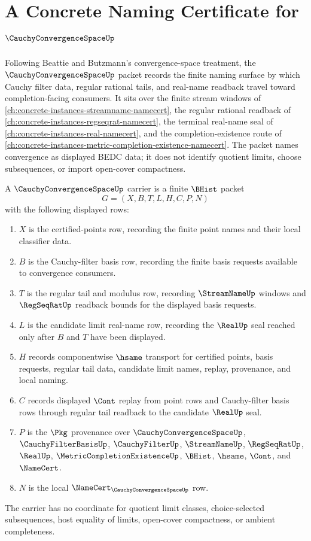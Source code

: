 \chapter{A Concrete Naming Certificate for $\CauchyConvergenceSpaceUp$}
\label{ch:concrete-instances-cauchy-convergence-space-namecert}

Following Beattie and Butzmann's convergence-space treatment, the $\CauchyConvergenceSpaceUp$ packet records the finite naming surface by which Cauchy filter data, regular rational tails, and real-name readback travel toward completion-facing consumers. It sits over the finite stream windows of \autoref{ch:concrete-instances-streamname-namecert}, the regular rational readback of \autoref{ch:concrete-instances-regseqrat-namecert}, the terminal real-name seal of \autoref{ch:concrete-instances-real-namecert}, and the completion-existence route of \autoref{ch:concrete-instances-metric-completion-existence-namecert}. The packet names convergence as displayed BEDC data; it does not identify quotient limits, choose subsequences, or import open-cover compactness.

\begin{definition}
\label{def:cauchy-convergence-space-carrier}
A $\CauchyConvergenceSpaceUp$ carrier is a finite $\BHist$ packet
$$
G=(X,B,T,L,H,C,P,N)
$$
with the following displayed rows:
\begin{enumerate}
\item $X$ is the certified-points row, recording the finite point names and their local classifier data.
\item $B$ is the Cauchy-filter basis row, recording the finite basis requests available to convergence consumers.
\item $T$ is the regular tail and modulus row, recording $\StreamNameUp$ windows and $\RegSeqRatUp$ readback bounds for the displayed basis requests.
\item $L$ is the candidate limit real-name row, recording the $\RealUp$ seal reached only after $B$ and $T$ have been displayed.
\item $H$ records componentwise $\hsame$ transport for certified points, basis requests, regular tail data, candidate limit names, replay, provenance, and local naming.
\item $C$ records displayed $\Cont$ replay from point rows and Cauchy-filter basis rows through regular tail readback to the candidate $\RealUp$ seal.
\item $P$ is the $\Pkg$ provenance over $\CauchyConvergenceSpaceUp$, $\CauchyFilterBasisUp$, $\CauchyFilterUp$, $\StreamNameUp$, $\RegSeqRatUp$, $\RealUp$, $\MetricCompletionExistenceUp$, $\BHist$, $\hsame$, $\Cont$, and $\NameCert$.
\item $N$ is the local $\NameCert_{\CauchyConvergenceSpaceUp}$ row.
\end{enumerate}
The carrier has no coordinate for quotient limit classes, choice-selected subsequences, host equality of limits, open-cover compactness, or ambient completeness.
\end{definition}

